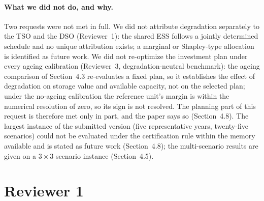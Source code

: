 \documentclass[11pt]{article}
\begin{document}
\paragraph{What we did not do, and why.}
Two requests were not met in full. We did not attribute degradation separately to the TSO and the DSO (Reviewer~1): the shared ESS follows a jointly determined schedule and no unique attribution exists; a marginal or Shapley-type allocation is identified as future work. We did not re-optimize the investment plan under every ageing calibration (Reviewer~3, degradation-neutral benchmark): the ageing comparison of Section~4.3 re-evaluates a fixed plan, so it establishes the effect of degradation on storage value and available capacity, not on the selected plan; under the no-ageing calibration the reference unit's margin is within the numerical resolution of zero, so its sign is not resolved. The planning part of this request is therefore met only in part, and the paper says so (Section~4.8). The largest instance of the submitted version (five representative years, twenty-five scenarios) could not be evaluated under the certification rule within the memory available and is stated as future work (Section~4.8); the multi-scenario results are given on a $3\times3$ scenario instance (Section~4.5).

\section*{Reviewer 1}
\end{document}
